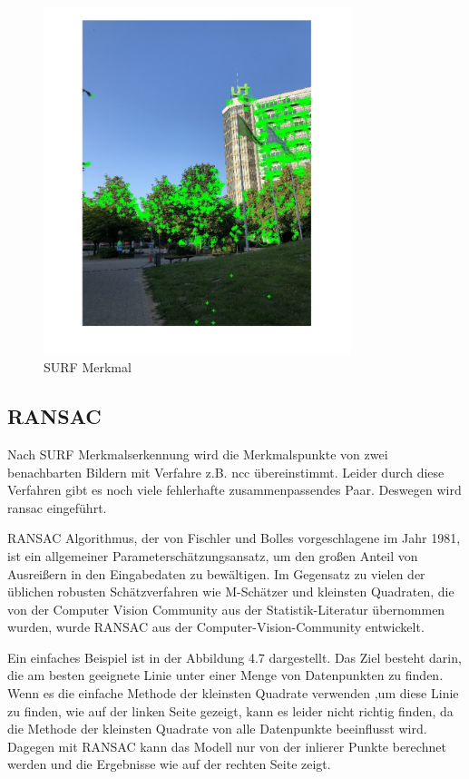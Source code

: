 \begin{figure}[H]
 \centering 
 \includegraphics[keepaspectratio,width=0.8\textwidth]{images/4_ZweiteErfahrung/SURF_Detektion.pdf}
 \caption{SURF Merkmal}
 \label{fig:SURF Merkmal}
\end{figure} 


\subsection{RANSAC}

Nach SURF Merkmalserkennung wird die Merkmalspunkte von zwei benachbarten Bildern mit Verfahre z.B. \gls{ncc} übereinstimmt. Leider durch diese Verfahren gibt es noch viele fehlerhafte zusammenpassendes Paar. Deswegen wird \gls{ransac} eingeführt.

RANSAC Algorithmus, der von Fischler und Bolles \cite{ransac1} vorgeschlagene im Jahr 1981, ist ein allgemeiner Parameterschätzungsansatz, um den großen Anteil von Ausreißern in den Eingabedaten zu bewältigen. Im Gegensatz zu vielen der üblichen robusten Schätzverfahren wie M-Schätzer und kleinsten Quadraten, die von der Computer Vision Community aus der Statistik-Literatur übernommen wurden, wurde RANSAC aus der Computer-Vision-Community entwickelt. 

Ein einfaches Beispiel ist in der Abbildung 4.7 dargestellt. Das Ziel besteht darin, die am besten geeignete Linie unter einer Menge von Datenpunkten zu finden. Wenn es die einfache Methode der kleinsten Quadrate verwenden ,um diese Linie zu finden, wie auf der linken Seite gezeigt, kann es leider nicht richtig finden, da die Methode der kleinsten Quadrate von alle Datenpunkte beeinflusst wird. Dagegen mit RANSAC kann das Modell nur von der inlierer Punkte berechnet werden und die Ergebnisse wie auf der rechten Seite zeigt. 

